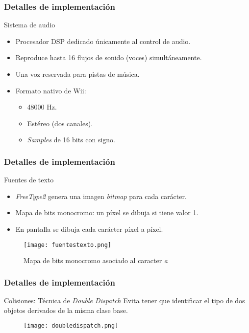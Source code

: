 \begin{frame}
\frametitle{Detalles de implementación}
	\begin{block}{Sistema de audio}
		\begin{itemize}
		\item Procesador DSP dedicado únicamente al control de audio.
		\item Reproduce hasta 16 flujos de sonido (voces) simultáneamente.
		\item Una voz reservada para pistas de música.
		\item Formato nativo de Wii:
			\begin{itemize}
			\item 48000 Hz.
			\item Estéreo (dos canales).
			\item \textit{Samples} de 16 bits con signo.
			\end{itemize}
		\end{itemize}
	\end{block}
\end{frame}

\begin{frame}
\frametitle{Detalles de implementación}
	\begin{block}{Fuentes de texto}
		\begin{itemize}
		\item \textit{FreeType2} genera una imagen \textit{bitmap} para cada carácter.
		\item Mapa de bits monocromo: un píxel se dibuja si tiene valor 1.
		\item En pantalla se dibuja cada carácter píxel a píxel.
		\end{itemize}
	\end{block}
	\begin{figure}[H]
		\label{fuentestexto}
		\begin{center}
		\texttt{[image: fuentestexto.png]}
		\end{center}
		\caption{Mapa de bits monocromo asociado al caracter \textit{a}}
	\end{figure}
\end{frame}

\begin{frame}
\frametitle{Detalles de implementación}
	\begin{block}{Colisiones: Técnica de \textit{Double Dispatch}}
		\noindent Evita tener que identificar el tipo de dos objetos derivados de la misma clase base.
	\end{block}
	\begin{figure}[H]
		\label{doubledispatch}
		\begin{center}
		\texttt{[image: doubledispatch.png]}
		\end{center}
	\end{figure}
\end{frame}

